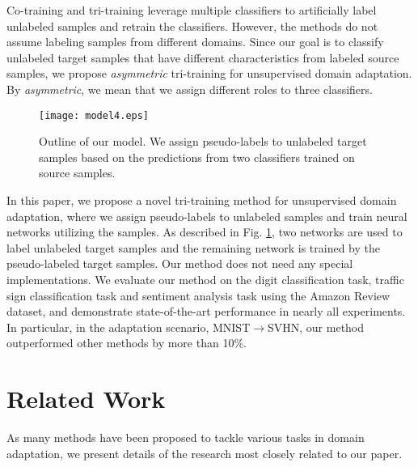 \documentclass{article}
\begin{document}
Co-training and tri-training \cite{zhou2005tri} leverage multiple classifiers to artificially label unlabeled samples and retrain the classifiers. However, the methods do not assume labeling samples from different domains. Since our goal is to classify unlabeled target samples that have different characteristics from labeled source samples, we propose \textit{asymmetric} tri-training for unsupervised domain adaptation. By \textit{asymmetric}, we mean that we assign different roles to three classifiers. 
\begin{figure}[t]
  \begin{center}
   \texttt{[image: model4.eps]}
  \end{center}
\caption{Outline of our model. We assign pseudo-labels to unlabeled target samples based on the predictions from two classifiers trained on source samples.}
    \label{fig:tri_train}
\end{figure}

In this paper, we propose a novel tri-training method for unsupervised domain adaptation, where we assign pseudo-labels to unlabeled samples and train neural networks utilizing the samples. As described in Fig. \ref{fig:tri_train}, two networks are used to label unlabeled target samples and the remaining network is trained by the pseudo-labeled target samples. Our method does not need any special implementations.
We evaluate our method on the digit classification task, traffic sign classification task and sentiment analysis task using the Amazon Review dataset, and demonstrate state-of-the-art performance in nearly all experiments. In particular, in the adaptation scenario, MNIST$\rightarrow$SVHN, our method outperformed other methods by more than 10\%. 
\vspace{-3mm}
\section{Related Work}
As many methods have been proposed to tackle various tasks in domain adaptation, we present details of the research most closely related to our paper.
\end{document}
